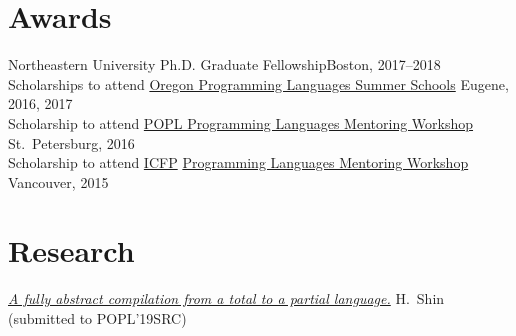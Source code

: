 \documentclass[margin,line]{resume}
\begin{document}
\begin{resume}
    \section{\mysidestyle Awards} 

    Northeastern University Ph.D. Graduate Fellowship\hfill Boston, 2017--2018\\[\mymedskip]
    Scholarships to attend
    \href{https://www.cs.uoregon.edu/research/summerschool/summer17}
    {Oregon Programming Languages Summer Schools} \hfill %
    Eugene, 2016, 2017\\[\mymedskip]
    Scholarship to attend 
     \href{http://conf.researchr.org/home/PLMW-2016}{POPL
        Programming Languages Mentoring Workshop} \hfill St.~Petersburg, 2016\\[\mymedskip]
            Scholarship to attend
           \href{http://icfpconference.org/icfp2015/}{ICFP}
           \href{https://www.cis.upenn.edu/~sweirich/icfp-plmw15/}
                {Programming Languages Mentoring Workshop}
\hfill         Vancouver, %
2015

\section{\mysidestyle Research} 
\textit{\href{https://github.com/hyeyoungshin/popl19src/blob/master/popl19src.pdf}{A fully abstract compilation from
    a total to a partial language.}} %
    H.~Shin %
    (submitted to {\small POPL}'19SRC) %
   

\end{resume}
\end{document}

